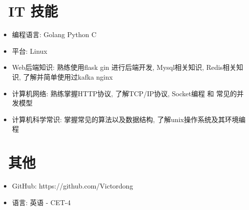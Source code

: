 \documentclass{resume}
\begin{document}
\section{\faCogs\ IT 技能}
\begin{itemize}[parsep=0.5ex]
  \item 编程语言: Golang Python C
  \item 平台: Linux
  \item Web后端知识: 熟练使用flask gin 进行后端开发, Mysql相关知识, Redis相关知识, 了解并简单使用过kafka nginx 
  \item 计算机网络: 熟练掌握HTTP协议, 了解TCP/IP协议, Socket编程 和 常见的并发模型
  \item 计算机科学常识: 掌握常见的算法以及数据结构, 了解unix操作系统及其环境编程
\end{itemize}



\section{\faInfo\ 其他}
\begin{itemize}[parsep=0.5ex]
  \item GitHub: https://github.com/Victordong
  \item 语言: 英语 - CET-4
\end{itemize}

%
%
\end{document}
